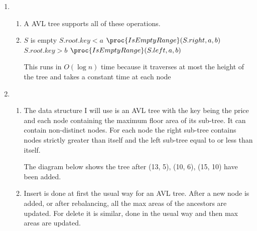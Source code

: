 \documentclass[10pt,a4paper]{article}
\begin{document}
\begin{enumerate}
\begin{enumerate}
$m_2 = 3 > 1.96 - 1$

$m_3 = 5 > 2.744 - 1$

$m_4 = 8 > 3.8416 - 1$

Assume that it is true for some $m_h$ where 
$h > 4$

Then $m_{h+1} = m_h + m_{h-1} - m_{h-5} \geq 1.4^h - 1 + 1.4^{h-1} - 1 - 1.4^{h-5} + 1 = 1.4^{h}(1+ 1.4^{-1} + 1.4^{-5}) - 1 > 1.4^h(1+ 0.7 + 0.18) -1 > 1.4^h(1.4) - 1 = 1.4^{h+1} -1$

\end{enumerate}
\item
\begin{enumerate}
\item A AVL tree supports all of these operations. 
\item 
\begin{codebox}
\li \If $S$ is empty
\zi \Then
\li		\Return {}
	\End 
\li \If $S.root.key < a$	
\zi \Then
\li			\Return $\proc{IsEmptyRange}(S.right, a, b)$
\li \ElseIf $S.root.key > b$
\zi	\Then 
\li 		\Return $\proc{IsEmptyRange}(S.left, a, b)$
\End
\li 	\Return {}
	

\end{codebox}

This runs in $O(\log n)$ time because it traverses at most the height of the tree and takes a constant time at each node
\end{enumerate}
\item
\begin{enumerate}
\item The data structure I will use is an AVL tree with the key being the price and each node containing the maximum floor area of its sub-tree. It can contain non-distinct nodes. For each node the right sub-tree contains nodes strictly greater than itself and the left sub-tree equal to or less than itself.

The diagram below shows the tree after (13, 5), (10, 6), (15, 10) have been added.

\item Insert is done at first the usual way for an AVL tree. After a new node is added, or after rebalancing, all the max areas of the ancestors are updated. For delete it is similar, done in the usual way and then max areas are updated.


\end{enumerate}
\end{enumerate}
\end{document}
